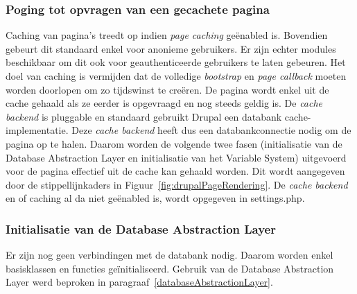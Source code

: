 \subsubsection{Poging tot opvragen van een gecachete pagina}
Caching van pagina's treedt op indien \textit{page caching} ge\"{e}nabled is. Bovendien gebeurt dit standaard enkel voor anonieme gebruikers. Er zijn echter modules beschikbaar om dit ook voor geauthenticeerde gebruikers te laten gebeuren. Het doel van caching is vermijden dat de volledige \textit{bootstrap} en \textit{page callback} moeten worden doorlopen om zo tijdswinst te cre\"{e}ren. De pagina  wordt enkel uit de cache gehaald als ze eerder is opgevraagd en nog steeds geldig is. De \textit{cache backend} is pluggable en standaard gebruikt Drupal een databank cache-implementatie. Deze \textit{cache backend} heeft dus een databankconnectie nodig om de pagina op te halen. Daarom worden de volgende twee fasen (initialisatie van de Database Abstraction Layer en initialisatie van het Variable System) uitgevoerd voor de pagina effectief uit de cache kan gehaald worden. Dit wordt aangegeven door de stippellijnkaders in Figuur~\ref{fig:drupalPageRendering}. De \textit{cache backend} en of caching al da niet ge\"{e}nabled is, wordt opgegeven in settings.php.

\subsubsection{Initialisatie van de Database Abstraction Layer}
Er zijn nog geen verbindingen met de databank nodig. Daarom worden enkel basisklassen en functies ge\"{i}nitialiseerd. Gebruik van de Database Abstraction Layer werd beproken in paragraaf~\ref{databaseAbstractionLayer}.

